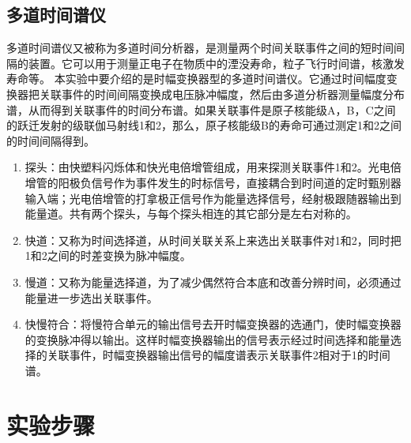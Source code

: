 \documentclass{article}
\begin{document}
\subsection{多道时间谱仪}
多道时间谱仪又被称为多道时间分析器，是测量两个时间关联事件之间的短时间间隔的装置。它可以用于测量正电子在物质中的湮没寿命，粒子飞行时间谱，核激发寿命等。
本实验中要介绍的是时幅变换器型的多道时间谱仪。它通过时间幅度变换器把关联事件的时间间隔变换成电压脉冲幅度，然后由多道分析器测量幅度分布谱，从而得到关联事件的时间分布谱。如果关联事件是原子核能级A，B，C之间的跃迁发射的级联伽马射线1和2，那么，原子核能级B的寿命可通过测定1和2之间的时间间隔得到。
\begin{enumerate}
    \item 探头：由快塑料闪烁体和快光电倍增管组成，用来探测关联事件1和2。光电倍增管的阳极负信号作为事件发生的时标信号，直接耦合到时间道的定时甄别器输入端；光电倍增管的打拿极正信号作为能量选择信号，经射极跟随器输出到能量道。共有两个探头，与每个探头相连的其它部分是左右对称的。
    \item 快道：又称为时间选择道，从时间关联关系上来选出关联事件对1和2，同时把1和2之间的时差变换为脉冲幅度。
    \item 慢道：又称为能量选择道，为了减少偶然符合本底和改善分辨时间，必须通过能量进一步选出关联事件。
    \item 快慢符合：将慢符合单元的输出信号去开时幅变换器的选通门，使时幅变换器的变换脉冲得以输出。这样时幅变换器输出的信号表示经过时间选择和能量选择的关联事件，时幅变换器输出信号的幅度谱表示关联事件2相对于1的时间谱。
\end{enumerate}
\section{实验步骤}
\end{document}
